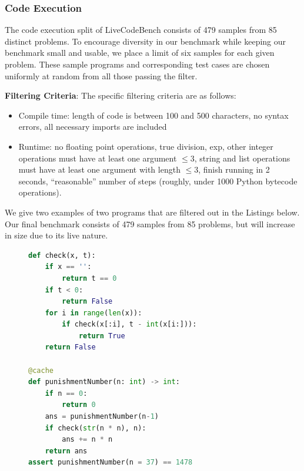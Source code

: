 \subsubsection{Code Execution} \label{appendix:dataset-execution}
The code execution split of LiveCodeBench consists of 479 samples from 85 distinct problems. To encourage diversity in our benchmark while keeping our benchmark small and usable, we place a limit of six samples for each given problem. These sample programs and corresponding test cases are chosen uniformly at random from all those passing the filter.

\textbf{Filtering Criteria}: The specific filtering criteria are as follows:
\begin{itemize}
\item Compile time: length of code is between 100 and 500 characters, no syntax errors, all necessary imports are included

\item Runtime: no floating point operations, true division, exp, other integer operations must have at least one argument $\le 3$, string and list operations must have at least one argument with length $\le 3$, finish running in 2 seconds, ``reasonable'' number of steps (roughly, under 1000 Python bytecode operations).
\end{itemize}

We give two examples of two programs that are filtered out in the Listings below. Our final benchmark consists of 479 samples from 85 problems, but will increase in size due to its live nature.

\begin{figure}[h!]
\centering
\begin{tcolorbox}[enhanced,size=small,colback=black!5!white,colframe=RoyalBlue,flip title={interior hidden},title={Program filtered because of multiplication}]
\begin{lstlisting}[label={}, captionpos=b, breaklines=true, language=Python]
def check(x, t):
    if x == '':
        return t == 0
    if t < 0:
        return False
    for i in range(len(x)):
        if check(x[:i], t - int(x[i:])):
            return True
    return False

@cache
def punishmentNumber(n: int) -> int:
    if n == 0:
        return 0
    ans = punishmentNumber(n-1)
    if check(str(n * n), n):
        ans += n * n
    return ans
assert punishmentNumber(n = 37) == 1478
\end{lstlisting}
\end{tcolorbox}
\end{figure}

